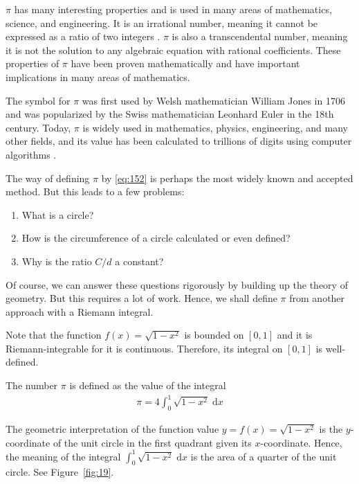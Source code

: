 \documentclass[thmcnt=section, 12pt]{my-elegantbook}
\begin{document}
$\pi$ has many interesting properties and is used in many areas of mathematics, science, and engineering. 
It is an irrational number, meaning it cannot be expressed 
as a ratio of two integers \cite{arndtPiunleashed2001}. 
$\pi$ is also a transcendental number, 
meaning it is not the solution to any algebraic equation 
with rational coefficients. 
These properties of $\pi$ have been proven mathematically 
and have important implications in many areas of mathematics.

The symbol for $\pi$ was first used by Welsh mathematician 
William Jones in 1706 
and was popularized by the Swiss mathematician Leonhard Euler 
in the 18th century. 
Today, $\pi$ is widely used 
in mathematics, physics, engineering, 
and many other fields, and its value has been 
calculated to trillions of digits 
using computer algorithms \cite{weissteinPi}.

The way of defining $\pi$ by \eqref{eq:152}
is perhaps the most widely known and accepted method.
But this leads to a few problems:
\begin{enumerate}
	\item What is a circle?
	\item How is the circumference of a circle calculated 
		or even defined?
	\item Why is the ratio $C / d$ a constant?
\end{enumerate}
Of course, we can answer these questions rigorously
by building up the theory of geometry.
But this requires a lot of work.
Hence, we shall define $\pi$ from another approach
with a Riemann integral.

Note that the function $f(x) = \sqrt{1 - x^2}$
is bounded on $[0, 1]$ and it is Riemann-integrable
for it is continuous.
Therefore, its integral on $[0, 1]$ is well-defined.

\begin{definition} \label{def:9}
	The number $\pi$\index{$\pi$} is defined as the 
	value of the integral
	\begin{align*}
		\pi = 4 \int_0^1 \sqrt{1 - x^2} \; \mathrm{d} x
	\end{align*}
\end{definition}

The geometric interpretation of the 
function value $y = f(x) = \sqrt{1 - x^2}$
is the $y$-coordinate of the unit circle
in the first quadrant given its $x$-coordinate.
Hence, the meaning of the 
integral $\int_0^1 \sqrt{1-x^2} \; \mathrm{d} x$
is the area of a quarter of the unit circle.
See Figure~\ref{fig:19}.
\end{document}
